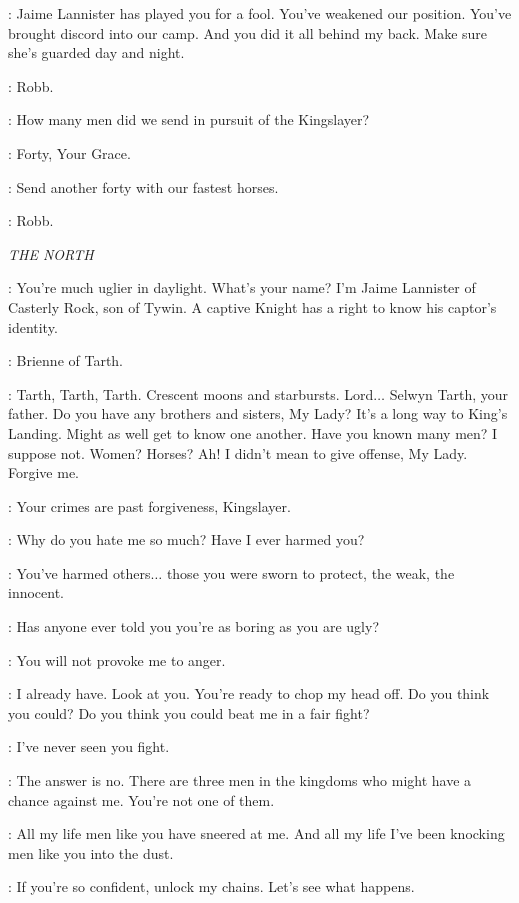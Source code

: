 \ROBB: Jaime Lannister has played you for a fool. You've weakened our position. You've brought discord into our camp. And you did it all behind my back. Make sure she's guarded day and night. 

\CATELYN: Robb. 

\ROBB: How many men did we send in pursuit of the Kingslayer? 

\KARSTARK: Forty, Your Grace. 

\ROBB: Send another forty with our fastest horses. 

\CATELYN: Robb. 


\scene

\textit{THE NORTH} 


\JAIME: You're much uglier in daylight. What's your name? I'm Jaime Lannister of Casterly Rock, son of Tywin. A captive Knight has a right to know his captor's identity. 

\BRIENNE: Brienne of Tarth. 

\JAIME: Tarth, Tarth, Tarth. Crescent moons and starbursts. Lord$\ldots$ Selwyn Tarth, your father. Do you have any brothers and sisters, My Lady? It's a long way to King's Landing. Might as well get to know one another. Have you known many men? I suppose not. Women? Horses? Ah! I didn't mean to give offense, My Lady. Forgive me. 

\BRIENNE: Your crimes are past forgiveness, Kingslayer. 

\JAIME: Why do you hate me so much? Have I ever harmed you? 

\BRIENNE: You've harmed others$\ldots$  those you were sworn to protect, the weak, the innocent. 

\JAIME: Has anyone ever told you you're as boring as you are ugly? 

\BRIENNE: You will not provoke me to anger. 

\JAIME: I already have. Look at you. You're ready to chop my head off. Do you think you could? Do you think you could beat me in a fair fight? 

\BRIENNE: I've never seen you fight. 

\JAIME: The answer is no. There are three men in the kingdoms who might have a chance against me. You're not one of them. 

\BRIENNE: All my life men like you have sneered at me. And all my life I've been knocking men like you into the dust. 

\JAIME: If you're so confident, unlock my chains. Let's see what happens. 

